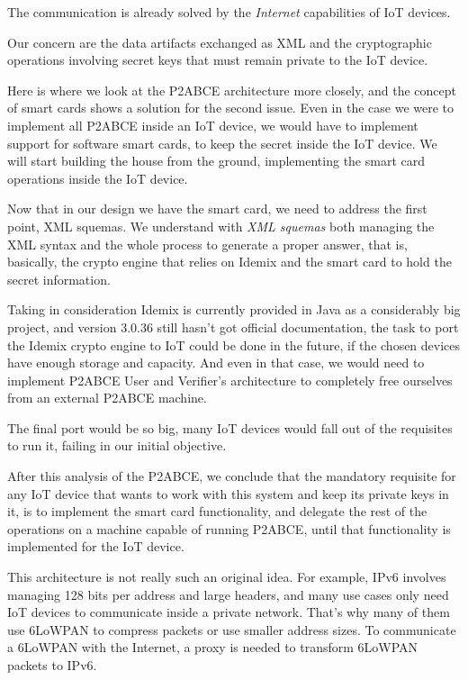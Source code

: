 The communication is already solved by the \textit{Internet} capabilities of IoT devices.

Our concern are the data artifacts exchanged as XML and the cryptographic operations involving secret keys that must remain private to the IoT device.

Here is where we look at the P2ABCE architecture more closely, and the concept of smart cards shows a solution for the second issue. Even in the case we were to implement all P2ABCE inside an IoT device, we would have to implement support for software smart cards, to keep the secret inside the IoT device. We will start building the house from the ground, implementing the smart card operations inside the IoT device.

Now that in our design we have the smart card, we need to address the first point, XML squemas. We understand with \textit{XML squemas} both managing the XML syntax and the whole process to generate a proper answer, that is, basically, the crypto engine that relies on Idemix and the smart card to hold the secret information.

Taking in consideration Idemix is currently provided in Java as a considerably big project, and version 3.0.36 still hasn't got official documentation, the task to port the Idemix crypto engine to IoT could be done in the future, if the chosen devices have enough storage and capacity. And even in that case, we would need to implement P2ABCE User and Verifier's architecture to completely free ourselves from an external P2ABCE machine.

The final port would be so big, many IoT devices would fall out of the requisites to run it, failing in our initial objective.

\hfil

After this analysis of the P2ABCE, we conclude that the mandatory requisite for any IoT device that wants to work with this system and keep its private keys in it, is to implement the smart card functionality, and delegate the rest of the operations on a machine capable of running P2ABCE, until that functionality is implemented for the IoT device. 


\hfil

This architecture is not really such an original idea. For example, IPv6 involves managing 128 bits per address and large headers, and many use cases only need IoT devices to communicate inside a private network. That's why many of them use 6LoWPAN to compress packets or use smaller address sizes. To communicate a 6LoWPAN with the Internet, a proxy is needed to transform 6LoWPAN packets to IPv6.

